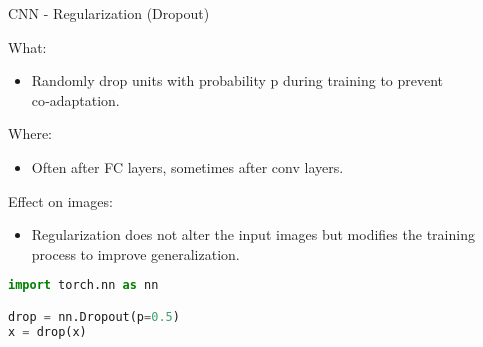 \begin{frame}[fragile]{CNN - Regularization (Dropout)}
\begin{block}{What:}
    \begin{itemize}
        \item Randomly drop units with probability p during training to prevent co‑adaptation.
    \end{itemize}
\end{block}

\begin{block}{Where:}
    \begin{itemize}
        \item Often after FC layers, sometimes after conv layers.
    \end{itemize}
\end{block}

\begin{block}{Effect on images:}
    \begin{itemize}
        \item Regularization does not alter the input images but modifies the training process to improve generalization. 
    \end{itemize}
\end{block}

\begin{lstlisting}[language=Python, caption={Code snippet (PyTorch)}, basicstyle=\ttfamily\footnotesize]
import torch.nn as nn

drop = nn.Dropout(p=0.5)
x = drop(x)
\end{lstlisting}


\end{frame}  